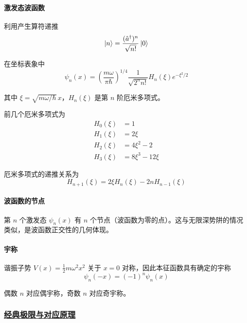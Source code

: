 \paragraph*{激发态波函数} 利用产生算符递推
\begin{equation}
    \ket{n} = \frac{(\hat{a}^\dagger)^n}{\sqrt{n!}}\ket{0}
\end{equation}

在坐标表象中
\begin{equation}
    \psi_n(x) = \left(\frac{m\omega}{\pi\hbar}\right)^{1/4} \frac{1}{\sqrt{2^n n!}} H_n(\xi) e^{-\xi^2/2}
\end{equation}

其中 $\xi = \sqrt{m\omega/\hbar}\,x$，$H_n(\xi)$ 是第 $n$ 阶厄米多项式。

前几个厄米多项式为
\begin{align}
    H_0(\xi) &= 1 \\
    H_1(\xi) &= 2\xi \\
    H_2(\xi) &= 4\xi^2 - 2 \\
    H_3(\xi) &= 8\xi^3 - 12\xi
\end{align}

厄米多项式的递推关系为
\begin{equation}
    H_{n+1}(\xi) = 2\xi H_n(\xi) - 2n H_{n-1}(\xi)
\end{equation}

\paragraph*{波函数的节点} 第 $n$ 个激发态 $\psi_n(x)$ 有 $n$ 个节点（波函数为零的点）。这与无限深势阱的情况类似，是波函数正交性的几何体现。

\paragraph*{宇称} 谐振子势 $V(x) = \frac{1}{2}m\omega^2 x^2$ 关于 $x = 0$ 对称，因此本征函数具有确定的宇称
\begin{equation}
    \psi_n(-x) = (-1)^n \psi_n(x)
\end{equation}

偶数 $n$ 对应偶宇称，奇数 $n$ 对应奇宇称。

\subsubsection{\protect\hyperlink{:}{经典极限与对应原理}}

